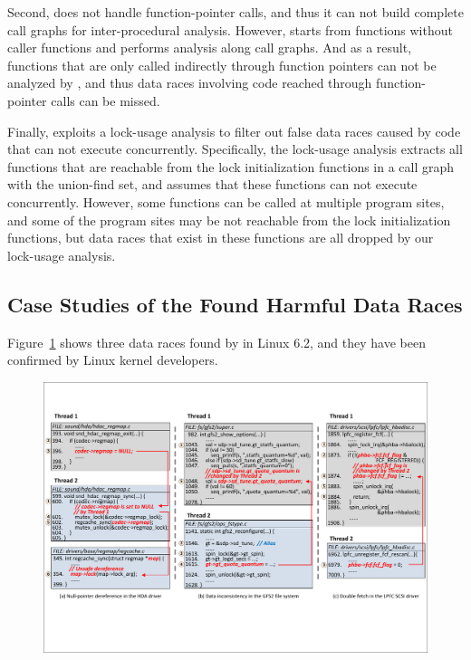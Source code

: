 Second, \sys does not handle function-pointer calls, and thus it can not build 
complete call graphs for inter-procedural analysis. However, \sys starts 
from functions without caller functions and performs analysis along call 
graphs. And as a result, functions that are only called indirectly through 
function pointers can not be analyzed by \sys, and thus data races involving 
code reached through function-pointer calls can be missed.

Finally, \sys exploits a lock-usage analysis to filter out false data races 
caused by code that can not execute concurrently. Specifically, the lock-usage 
analysis extracts all functions that are reachable from the lock initialization 
functions in a call graph with the union-find set, and assumes that these 
functions can not execute concurrently. However, some functions can be called 
at multiple program sites, and some of the program sites may be not reachable 
from the lock initialization functions, but data races that exist in these 
functions are all dropped by our lock-usage analysis.

\subsection{Case Studies of the Found Harmful Data Races}
\label{subsec_case_study}

Figure~\ref{fig_case_bugs} shows three data races found by \sys in Linux 6.2,
and they have been confirmed by Linux kernel developers.

\begin{figure}[htbp]
	\centering
	\includegraphics[width=1\linewidth]{figures/fig_case_bugs.pdf}
	\label{fig_case_bugs}
\end{figure}

